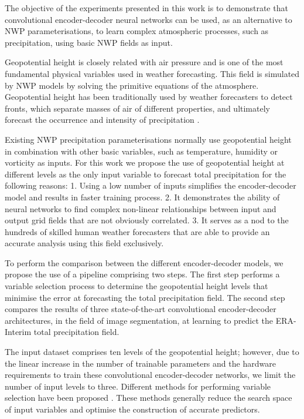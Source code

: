 \documentclass[twocol]{ametsoc}
\begin{document}
The objective of the experiments presented in this work is to demonstrate that convolutional encoder-decoder neural networks can be used, as an alternative to NWP parameterisations, to learn complex atmospheric processes, such as precipitation, using basic NWP fields as input.

Geopotential height is closely related with air pressure and is one of the most fundamental physical variables used in weather forecasting. This field is simulated by NWP models by solving the primitive equations of the atmosphere. Geopotential height has been traditionally used by weather forecasters to detect fronts, which separate masses of air of different properties, and ultimately forecast the occurrence and intensity of precipitation \citep{renard1965experiments,hope2014comparison}.

Existing NWP precipitation parameterisations normally use geopotential height in combination with other basic variables, such as temperature, humidity or vorticity as inputs. For this work we propose the use of geopotential height at different levels as the only input variable to forecast total precipitation for the following reasons: 1. Using a low number of inputs simplifies the encoder-decoder model and results in faster training process. 2. It demonstrates the ability of neural networks to find complex non-linear relationships between input and output grid fields that are not obviously correlated. 3. It serves as a nod to the hundreds of skilled human weather forecasters that are able to provide an accurate analysis using this field exclusively.

To perform the comparison between the different encoder-decoder models, we propose the use of a pipeline comprising two steps. The first step performs a variable selection process to determine the geopotential height levels that minimise the error at forecasting the total precipitation field. The second step compares the results of three state-of-the-art convolutional encoder-decoder architectures, in the field of image segmentation, at learning to predict the ERA-Interim total precipitation field.

The input dataset comprises ten levels of the geopotential height; however, due to the linear increase in the number of trainable parameters and the hardware requirements to train these convolutional encoder-decoder networks, we limit the number of input levels to three. Different methods for performing variable selection have been proposed \citep{saeys2007review}. These methods generally reduce the search space of input variables and optimise the construction of accurate predictors. 
\end{document}
